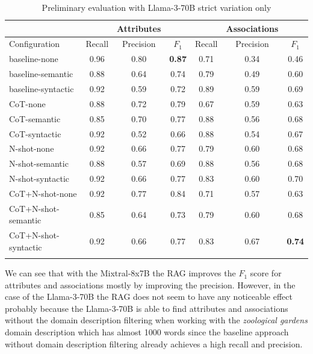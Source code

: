 \begin{table}[!h]
    \scriptsize
    \centering
    \setlength{\tabcolsep}{0.5em}
    \begin{tabular}{lcccccc}
    \toprule
        & & Attributes & & & Associations & \\
     \toprule
        Configuration & Recall & Precision & $F_1$ & Recall & Precision & $F_1$ \\
    \toprule
    
    \addlinespace
         baseline-none        & 0.96 & 0.80 & \textbf{0.87} & 0.71 & 0.34 & 0.46 \\
    	 baseline-semantic    & 0.88 & 0.64 & 0.74 & 0.79 & 0.49 & 0.60 \\
         baseline-syntactic   & 0.92 & 0.59 & 0.72 & 0.89 & 0.59 & 0.69 \\
         CoT-none             & 0.88 & 0.72 & 0.79 & 0.67 & 0.59 & 0.63 \\
         CoT-semantic         & 0.85 & 0.70 & 0.77 & 0.88 & 0.56 & 0.68 \\
         CoT-syntactic        & 0.92 & 0.52 & 0.66 & 0.88 & 0.54 & 0.67 \\
         N-shot-none          & 0.92 & 0.66 & 0.77 & 0.79 & 0.60 & 0.68 \\
         N-shot-semantic      & 0.88 & 0.57 & 0.69 & 0.88 & 0.56 & 0.68 \\
         N-shot-syntactic     & 0.92 & 0.66 & 0.77 & 0.83 & 0.60 & 0.70 \\
         CoT+N-shot-none      & 0.92 & 0.77 & 0.84 & 0.71 & 0.57 & 0.63 \\
         CoT+N-shot-semantic  & 0.85 & 0.64 & 0.73 & 0.79 & 0.60 & 0.68 \\
         CoT+N-shot-syntactic & 0.92 & 0.66 & 0.77 & 0.83 & 0.67 & \textbf{0.74} \\
    \addlinespace
    \bottomrule
    \addlinespace
    \end{tabular}
    \caption{Preliminary evaluation with Llama-3-70B strict variation only}
    \label{tab:preliminary-llama}
\end{table}

We can see that with the Mixtral-8x7B the RAG improves the $F_1$ score for attributes and associations mostly by improving the precision. However, in the case of the Llama-3-70B the RAG does not seem to have any noticeable effect probably because the Llama-3-70B is able to find attributes and associations without the domain description filtering when working with the \textit{zoological gardens} domain description which has almost 1000 words since the baseline approach without domain description filtering already achieves a high recall and precision. %

